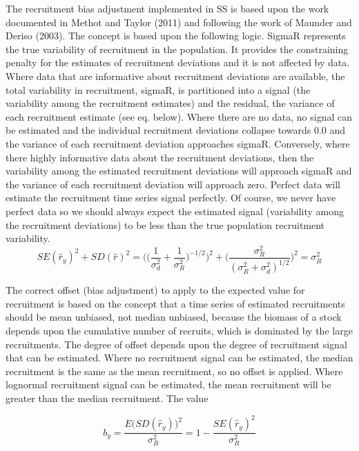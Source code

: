 The recruitment bias adjustment implemented in SS is based upon the work documented in Methot and Taylor (2011) and following the work of Maunder and Deriso (2003).  The concept is based upon the following logic.  SigmaR represents the true variability of recruitment in the population.  It provides the constraining penalty for the estimates of recruitment deviations and it is not affected by data.  Where data that are informative about recruitment deviations are available, the total variability in recruitment, sigmaR, is partitioned into a signal (the variability among the recruitment estimates) and the residual, the variance of each recruitment estimate (see eq. below).  Where there are no data, no signal can be estimated and the individual recruitment deviations collapse towards 0.0 and the variance of each recruitment deviation approaches sigmaR.  Conversely, where there highly informative data about the recruitment deviations, then the variability among the estimated recruitment deviations will approach sigmaR and the variance of each recruitment deviation will approach zero.  Perfect data will estimate the recruitment time series signal perfectly.  Of course, we never have perfect data so we should always expect the estimated signal (variability among the recruitment deviations) to be less than the true population recruitment variability.
\begin{equation}
	SE(\hat{r}_y)^2 + SD(\hat{r})^2=\Bigg( \bigg( \frac{1}{\sigma^2_d}+\frac{1}{\sigma^2_R}\bigg)^{-1/2}\Bigg)^2+\Bigg( \frac{\sigma^2_R}{(\sigma^2_R+\sigma^2_d)^{1/2}}\Bigg)^2=\sigma^2_R
\end{equation}

The correct offset (bias adjustment) to apply to the expected value for recruitment is based on the concept that a time series of estimated recruitments should be mean unbiased, not median unbiased, because the biomass of a stock depends upon the cumulative number of recruits, which is dominated by the large recruitments.  The degree of offset depends upon the degree of recruitment signal that can be estimated.  Where no recruitment signal can be estimated, the median recruitment is the same as the mean recruitment, so no offset is applied.  Where lognormal recruitment signal can be estimated, the mean recruitment will be greater than the median recruitment.  The value

\begin{equation}
	b_y=\frac{E\Big( SD(\hat{r}_y)\Big)^2}{\sigma^2_R}=1-\frac{SE(\hat{r}_y)^2}{\sigma^2_R}
\end{equation}

